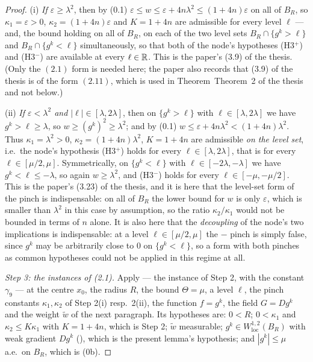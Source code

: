 \begin{proof}
\textup{(i)} \emph{If $\varepsilon\ge\lambda^2$}, then by (0.1)
$\varepsilon\le w\le\varepsilon+4n\lambda^2\le(1+4n)\varepsilon$ on all of
$B_R$, so $\kappa_1=\varepsilon>0$, $\kappa_2=(1+4n)\varepsilon$ and $K=1+4n$ are
admissible for every level $\ell$ --- and, the bound holding on all of $B_R$, on
each of the two level sets $B_R\cap\{g^k>\ell\}$ and $B_R\cap\{g^k<\ell\}$
simultaneously, so that both of the node's hypotheses (H3$^+$) and (H3$^-$) are
available at every $\ell\in\mathbb{R}$.  This is the paper's (3.9) of the thesis.  (Only the
$(2.1)$ form is needed here; the paper also records that (3.9) of the thesis is of the
form $(2.11)$, which is used in Theorem~Theorem~2 of the thesis and not below.)

\textup{(ii)} \emph{If $\varepsilon<\lambda^2$ and $|\ell|\in[\lambda,2\lambda]$},
then on $\{g^k>\ell\}$ with $\ell\in[\lambda,2\lambda]$ we have
$g^k>\ell\ge\lambda$, so $w\ge(g^k)^2\ge\lambda^2$; and by (0.1)
$w\le\varepsilon+4n\lambda^2<(1+4n)\lambda^2$.  Thus $\kappa_1=\lambda^2>0$,
$\kappa_2=(1+4n)\lambda^2$, $K=1+4n$ are admissible \emph{on the level set},
i.e.\ the node's hypothesis (H3$^+$) holds for every $\ell\in[\lambda,2\lambda]$,
that is for every $\ell\in[\mu/2,\mu]$.  Symmetrically, on $\{g^k<\ell\}$ with
$\ell\in[-2\lambda,-\lambda]$ we have $g^k<\ell\le-\lambda$, so again
$w\ge\lambda^2$, and (H3$^-$) holds for every $\ell\in[-\mu,-\mu/2]$.  This is
the paper's (3.23) of the thesis, and it is here that the level-set form of the pinch
is indispensable: on all of $B_R$ the lower bound for $w$ is only $\varepsilon$,
which is smaller than $\lambda^2$ in this case by assumption, so the ratio
$\kappa_2/\kappa_1$ would not be bounded in terms of $n$ alone.  It is also here
that the \emph{decoupling} of the node's two implications is indispensable: at a
level $\ell\in[\mu/2,\mu]$ the $-$ pinch is simply false, since $g^k$ may be
arbitrarily close to $0$ on $\{g^k<\ell\}$, so a form with both pinches as common
hypotheses could not be applied in this regime at all.

\emph{Step 3: the instances of \textup{(2.1)}.}  Apply
 --- the instance of Step 2, with the
constant $\gamma_9$ --- at the centre $x_0$, the radius $R$, the bound
$\Theta=\mu$, a level $\ell$, the pinch constants $\kappa_1,\kappa_2$ of
Step 2(i) resp.\ 2(ii), the function $f=g^k$, the field $G=Dg^k$ and the weight
$\widetilde w$ of the next paragraph.  Its hypotheses are: $0<R$; $0<\kappa_1$
and $\kappa_2\le K\kappa_1$ with $K=1+4n$, which is Step 2;
$\widetilde w$ measurable; $g^k\in W^{1,2}_{\mathrm{loc}}(B_R)$ with
weak gradient $Dg^k$ (), which is the present lemma's
hypothesis; and $|g^k|\le\mu$ a.e.\ on $B_R$, which is (0b).


\end{proof}
